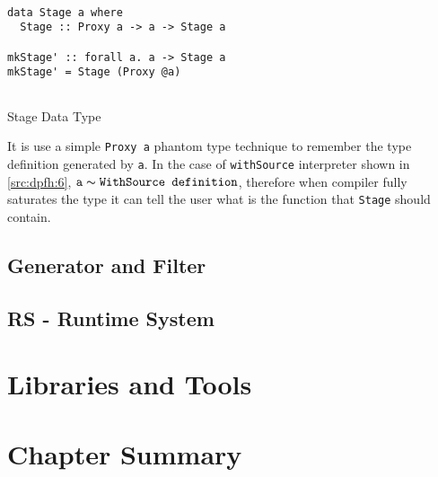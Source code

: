 \begin{listing}[H]
  \begin{verbatim}

data Stage a where
  Stage :: Proxy a -> a -> Stage a

mkStage' :: forall a. a -> Stage a
mkStage' = Stage (Proxy @a)
    
  \end{verbatim}
  \caption{Stage Data Type}
  \label{src:dpfh:8}
\end{listing}

It is use a simple \texttt{Proxy a} phantom type technique to remember the type definition generated by \texttt{a}.
In the case of \texttt{withSource} interpreter shown in \autoref{src:dpfh:6}, $\texttt{a} \thicksim \texttt{WithSource definition}$, therefore 
when compiler fully saturates the type it can tell the user what is the function that \texttt{Stage} should contain.

\subsection{Generator and Filter}

\subsection{RS - Runtime System}

\section{Libraries and Tools}

\section{Chapter Summary}

